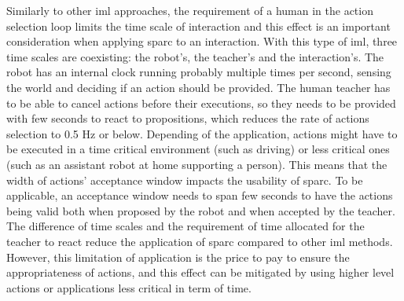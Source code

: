 Similarly to other \gls{iml} approaches, the requirement of a human in the action selection loop limits the time scale of interaction and this effect is an important consideration when applying \gls{sparc} to an interaction. With this type of \gls{iml}, three time scales are coexisting: the robot's, the teacher's and the interaction's. The robot has an internal clock running probably multiple times per second, sensing the world and deciding if an action should be provided. The human teacher has to be able to cancel actions before their executions, so they needs to be provided with few seconds to react to propositions, which reduces the rate of actions selection to 0.5 Hz or below. Depending of the application, actions might have to be executed in a time critical environment (such as driving) or less critical ones (such as an assistant robot at home supporting a person). This means that the width of actions' acceptance window impacts the usability of \gls{sparc}. To be applicable, an acceptance window needs to span few seconds to have the actions being valid both when proposed by the robot and when accepted by the teacher. The difference of time scales and the requirement of time allocated for the teacher to react reduce the application of \gls{sparc} compared to other \gls{iml} methods. However, this limitation of application is the price to pay to ensure the appropriateness of actions, and this effect can be mitigated by using higher level actions or applications less critical in term of time.  %

